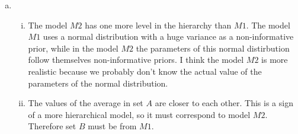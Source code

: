 \documentclass{article}
\theoremstyle{plain}
\theoremstyle{definition}
\newenvironment{exercise}[1]
  {\renewcommand\theexerciseaux{#1}\exerciseaux\label{ejer:#1}}
  {\endexerciseaux}
\newenvironment{sol}{\begin{trivlist}
 \item[\hskip \labelsep {\textit{Solution}.}\hskip \labelsep]}{\end{trivlist}}
\begin{document}
\begin{exercise}{B4}
\end{exercise}
\begin{sol}
\begin{enumerate}[(a)]
\item
\begin{enumerate}[(i)]
\item The model $M2$ has one more level in the hierarchy than $M1$. The model $M1$ uses a normal distribution with a huge variance as a non-informative prior, while in the model $M2$ the parameters of this normal distirbution follow themselves non-informative priors. I think the model $M2$ is more realistic because we probably don't know the actual value of the parameters of the normal distribution.
\item The values of the average in set $A$ are closer to each other. This is a sign of a more hierarchical model, so it must correspond to model $M2$. Therefore set $B$ must be from $M1$.
\end{enumerate}
\end{enumerate}
\end{sol}
\end{document}

